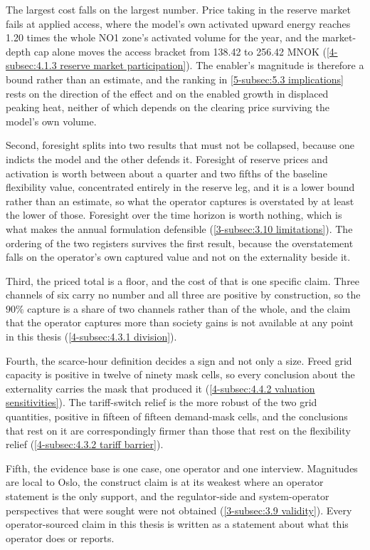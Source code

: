 The largest cost falls on the largest number. Price taking in the reserve market fails at applied access, where the model's own activated upward energy reaches 1.20 times the whole NO1 zone's activated volume for the year, and the market-depth cap alone moves the access bracket from 138.42 to 256.42 MNOK (\autoref{4-subsec:4.1.3 reserve market participation}). The enabler's magnitude is therefore a bound rather than an estimate, and the ranking in \autoref{5-subsec:5.3 implications} rests on the direction of the effect and on the enabled growth in displaced peaking heat, neither of which depends on the clearing price surviving the model's own volume.

Second, foresight splits into two results that must not be collapsed, because one indicts the model and the other defends it. Foresight of reserve prices and activation is worth between about a quarter and two fifths of the baseline flexibility value, concentrated entirely in the reserve leg, and it is a lower bound rather than an estimate, so what the operator captures is overstated by at least the lower of those. Foresight over the time horizon is worth nothing, which is what makes the annual formulation defensible (\autoref{3-subsec:3.10 limitations}). The ordering of the two registers survives the first result, because the overstatement falls on the operator's own captured value and not on the externality beside it.

Third, the priced total is a floor, and the cost of that is one specific claim. Three channels of six carry no number and all three are positive by construction, so the $90\%$ capture is a share of two channels rather than of the whole, and the claim that the operator captures more than society gains is not available at any point in this thesis (\autoref{4-subsec:4.3.1 division}).

Fourth, the scarce-hour definition decides a sign and not only a size. Freed grid capacity is positive in twelve of ninety mask cells, so every conclusion about the externality carries the mask that produced it (\autoref{4-subsec:4.4.2 valuation sensitivities}). The tariff-switch relief is the more robust of the two grid quantities, positive in fifteen of fifteen demand-mask cells, and the conclusions that rest on it are correspondingly firmer than those that rest on the flexibility relief (\autoref{4-subsec:4.3.2 tariff barrier}).

Fifth, the evidence base is one case, one operator and one interview. Magnitudes are local to Oslo, the construct claim is at its weakest where an operator statement is the only support, and the regulator-side and system-operator perspectives that were sought were not obtained (\autoref{3-subsec:3.9 validity}). Every operator-sourced claim in this thesis is written as a statement about what this operator does or reports.

